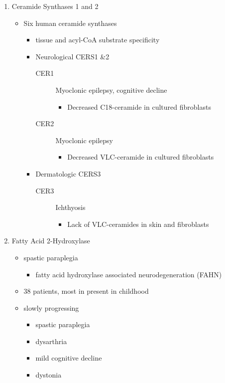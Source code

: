 \documentclass{scrartcl}
\begin{document}
\begin{enumerate}
\item Ceramide Synthases 1 and 2
\label{sec:org5132754}

\begin{itemize}
\item Six human ceramide synthases
\begin{itemize}
\item tissue and acyl-CoA substrate specificity
\item Neurological CERS1 \&2
\begin{description}
\item[{CER1}] Myoclonic epilepsy, cognitive decline
\begin{itemize}
\item Decreased C18-ceramide in cultured fibroblasts
\end{itemize}
\item[{CER2}] Myoclonic epilepsy
\begin{itemize}
\item Decreased VLC-ceramide in cultured fibroblasts
\end{itemize}
\end{description}
\item Dermatologic CERS3
\begin{description}
\item[{CER3}] Ichthyosis
\begin{itemize}
\item Lack of VLC-ceramides in skin and fibroblasts
\end{itemize}
\end{description}
\end{itemize}
\end{itemize}

\item Fatty Acid 2-Hydroxylase
\label{sec:org24693f0}

\begin{itemize}
\item spastic paraplegia
\begin{itemize}
\item fatty acid hydroxylase associated neurodegeneration (FAHN)
\end{itemize}
\item 38 patients, most in present in childhood
\item slowly progressing
\begin{itemize}
\item spastic paraplegia
\item dysarthria
\item mild cognitive decline
\item dystonia
\end{itemize}


\end{itemize}
\end{enumerate}
\end{document}
